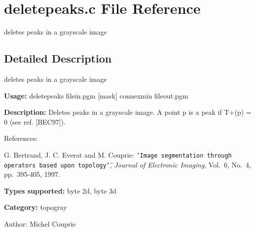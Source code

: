 \section{deletepeaks.c File Reference}
\label{deletepeaks_8c}
deletes peaks in a grayscale image 



\subsection{Detailed Description}
deletes peaks in a grayscale image 

{\bf Usage:} deletepeaks filein.pgm [mask] connexmin fileout.pgm

{\bf Description:} Deletes peaks in a grayscale image. A point p is a peak if T+(p) = 0 (see ref. [BEC97]).

References:\par
 [BEC97] G. Bertrand, J. C. Everat and M. Couprie: {\tt \char`\"{}Image segmentation through operators based upon topology\char`\"{}}, {\em  Journal of Electronic Imaging\/}, Vol.~6, No.~4, pp.~395-405, 1997.\par


{\bf Types supported:} byte 2d, byte 3d

{\bf Category:} topogray

\begin{Desc}
\item[Author:]Michel Couprie \end{Desc}
